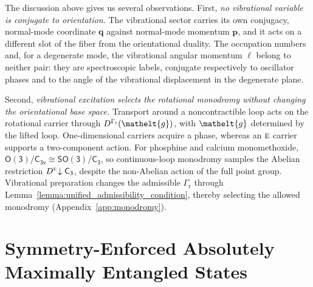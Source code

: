 \documentclass[
  reprint,
  aps,
  prx,
  superscriptaddress,
  amsmath,
  amssymb,
  longbibliography
]{revtex4-2}
\newcommand{\eltfont}[1]{{\let\sigma\eltsigma\mathelt{#1}}}
\newcommand{\grp}[1]{\mathsf{#1}}
\newcommand{\irr}[1]{\text{\normalfont\scshape #1}}
\newcommand{\elt}[1]{\eltfont{#1}}
\newcommand{\restr}[2]{#1\!\downarrow#2}
\newcommand{\repD}[1]{D^{#1}}
\newcommand{\gel}{\elt{g}}             %
\providecommand{\Grot}{\Gamma_{\mathrm{r}}}
\begin{document}
The discussion above gives us several observations. First, \emph{no vibrational variable is conjugate to orientation.} The vibrational sector carries its own conjugacy, normal-mode coordinate $\mathbf q$ against normal-mode momentum $\mathbf p$, and it acts on a different slot of the fiber from the orientational duality. The occupation numbers and, for a degenerate mode, the vibrational angular momentum $\ell$ belong to neither pair: they are spectroscopic labels, conjugate respectively to oscillator phases and to the angle of the vibrational displacement in the degenerate plane. 

Second, \emph{vibrational excitation selects the rotational monodromy without changing the orientational base space.} Transport around a noncontractible loop acts on the rotational carrier through \(\repD{\Grot}(\gel)\), with \(\gel\) determined by the lifted loop. One-dimensional carriers acquire a phase, whereas an \(\irr{e}\) carrier supports a two-component action. For phosphine and calcium monomethoxide, \(\grp{O(3)}/\grp{C_{3v}}\cong\grp{SO(3)}/\grp{C_{3}}\), so continuous-loop monodromy samples the Abelian restriction \(\restr{\repD{\irr{e}}}{\grp{C_{3}}}\), despite the non-Abelian action of the full point group. Vibrational preparation changes the admissible \(\Grot\) through Lemma~\ref{lemma:unified_admissibility_condition}, thereby selecting the allowed monodromy (Appendix~\ref{app:monodromy}).









\section{Symmetry-Enforced Absolutely Maximally Entangled States}
\label{sec:entang}
\end{document}
